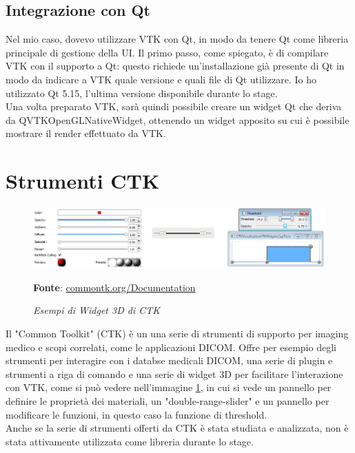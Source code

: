 \subsection{Integrazione con Qt}\label{sec:qt-integrazione}
Nel mio caso, dovevo utilizzare VTK con Qt, in modo da tenere Qt come libreria principale di gestione della UI. Il primo passo, come spiegato, è di compilare VTK con il supporto a Qt: questo richiede un'installazione già presente di Qt in modo da indicare a VTK quale versione e quali file di Qt utilizzare. Io ho utilizzato Qt 5.15, l'ultima versione disponibile durante lo stage.\\
Una volta preparato VTK, sarà quindi possibile creare un widget Qt che deriva da QVTKOpenGLNativeWidget, ottenendo un widget apposito su cui è possibile mostrare il render effettuato da VTK.

\section{Strumenti CTK}
\begin{figure}[h]
    \centering
    \includegraphics[scale=0.35]{immagini/volumerendering/ctkwidgets.png}
    \caption{\textit{Esempi di Widget 3D di CTK}}
    \textbf{Fonte}: \href{https://commontk.org/index.php/Documentation/ImageGallery}{commontk.org/Documentation}
    \label{fig: CTK 3D Widgets}
\end{figure}

Il "Common Toolkit" (CTK) è un una serie di strumenti di supporto per imaging medico e scopi correlati, come le applicazioni DICOM. Offre per esempio degli strumenti per interagire con i databse medicali DICOM, una serie di plugin e strumenti a riga di comando e una serie di widget 3D per facilitare l'interazione con VTK, come si può vedere nell'immagine \ref{fig: CTK 3D Widgets}, in cui si vede un pannello per definire le proprietà dei materiali, un "double-range-slider" e un pannello per modificare le funzioni, in questo caso la funzione di threshold.
\\
Anche se la serie di strumenti offerti da CTK è stata studiata e analizzata, non è stata attivamente utilizzata come libreria durante lo stage.

